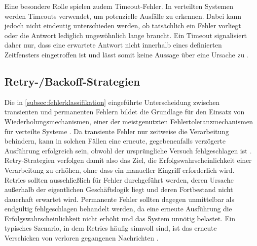 Eine besondere Rolle spielen zudem Timeout-Fehler.
In verteilten Systemen werden Timeouts verwendet, um potenzielle Ausfälle zu erkennen.
Dabei kann jedoch nicht eindeutig unterschieden werden, ob tatsächlich ein Fehler vorliegt oder die Antwort lediglich
ungewöhnlich lange braucht.
Ein Timeout signalisiert daher nur, dass eine erwartete Antwort nicht innerhalb eines definierten Zeitfensters eingetroffen
ist und lässt somit keine Aussage über eine Ursache zu \parencite[Kap.~17.2 Abschnitt \glqq Failure in the Cloud\grqq]{bass_software_2021}.

\subsection{Retry-/Backoff-Strategien}
\label{subsec:retry/backoff}
Die in \cref{subsec:fehlerklassifikation} eingeführte Unterscheidung zwischen transienten und permanenten Fehlern bildet
die Grundlage für den Einsatz von Wiederholungsmechanismen, einer der meistgenutzten Fehlertoleranzmechanismen für verteilte
Systeme \parencite{ledmi_fault_2018}.
Da transiente Fehler nur zeitweise die Verarbeitung behindern, kann in solchen Fällen eine erneute, gegebenenfalls verzögerte
Ausführung erfolgreich sein, obwohl der ursprüngliche Versuch fehlgeschlagen ist \parencite[Kap.~3 Abschnitt \glqq Should You Always Retry?\grqq]{newman_building_2026}.
Retry-Strategien verfolgen damit also das Ziel, die Erfolgswahrscheinlichkeit einer Verarbeitung zu erhöhen, ohne dass
ein manueller Eingriff erforderlich wird.
Retries sollten ausschließlich für Fehler durchgeführt werden, deren Ursache außerhalb der eigentlichen Geschäftslogik liegt
und deren Fortbestand nicht dauerhaft erwartet wird.
Permanente Fehler sollten dagegen unmittelbar als endgültig fehlgeschlagen behandelt werden, da eine erneute Ausführung die
Erfolgswahrscheinlichkeit nicht erhöht und das System unnötig belastet.
Ein typisches Szenario, in dem Retries häufig sinnvoll sind, ist das erneute Verschicken von verloren gegangenen Nachrichten
\parencites[{Kap.~3 Abschnitt \glqq Should You Always Retry?\grqq}]{newman_building_2026}[Abschnitt \glqq Reliability considerations\grqq]{microsoft_corporation_hrsg_best_2026}.

